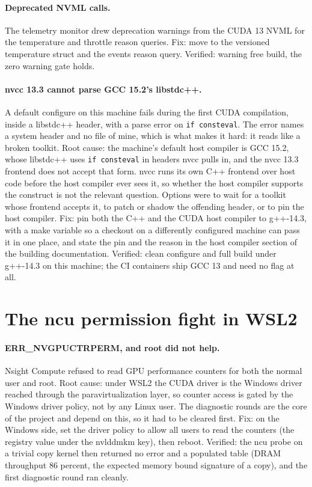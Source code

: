\documentclass[11pt]{article}
\begin{document}
\paragraph{Deprecated NVML calls.} The telemetry monitor drew deprecation warnings
from the CUDA 13 NVML for the temperature and throttle reason queries. Fix: move to
the versioned temperature struct and the events reason query. Verified: warning
free build, the zero warning gate holds.

\paragraph{nvcc 13.3 cannot parse GCC 15.2's libstdc++.} A default configure on
this machine fails during the first CUDA compilation, inside a libstdc++ header,
with a parse error on \texttt{if consteval}. The error names a system header and no
file of mine, which is what makes it hard: it reads like a broken toolkit. Root
cause: the machine's default host compiler is GCC 15.2, whose libstdc++ uses
\texttt{if consteval} in headers nvcc pulls in, and the nvcc 13.3 frontend does not
accept that form. nvcc runs its own C++ frontend over host code before the host
compiler ever sees it, so whether the host compiler supports the construct is not
the relevant question. Options were to wait for a toolkit whose frontend accepts
it, to patch or shadow the offending header, or to pin the host compiler. Fix: pin
both the C++ and the CUDA host compiler to g++-14.3, with a make variable so a
checkout on a differently configured machine can pass it in one place, and state
the pin and the reason in the host compiler section of the building
documentation. Verified: clean configure and full build under g++-14.3 on this
machine; the CI containers ship GCC 13 and need no flag at all.

\section{The ncu permission fight in WSL2}

\paragraph{ERR\_NVGPUCTRPERM, and root did not help.} Nsight Compute refused to
read GPU performance counters for both the normal user and root. Root cause: under
WSL2 the CUDA driver is the Windows driver reached through the paravirtualization
layer, so counter access is gated by the Windows driver policy, not by any Linux
user. The diagnostic rounds are the core of the project and depend on this, so it
had to be cleared first. Fix: on the Windows side, set the driver policy to allow
all users to read the counters (the registry value under the nvlddmkm key), then
reboot. Verified: the ncu probe on a trivial copy kernel then returned no error and
a populated table (DRAM throughput 86 percent, the expected memory bound signature
of a copy), and the first diagnostic round ran cleanly.
\end{document}
